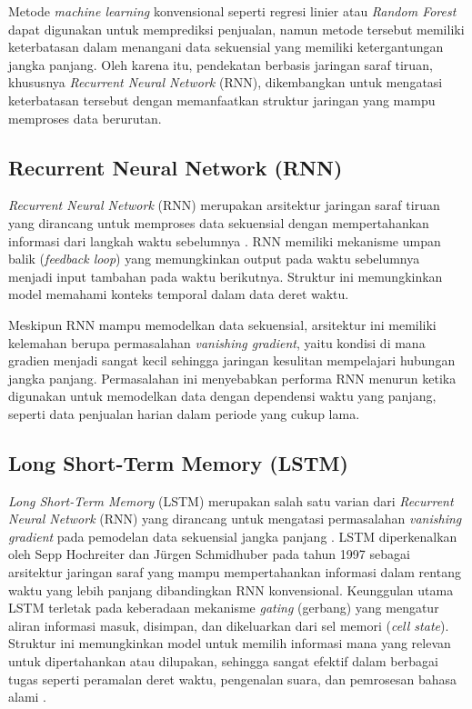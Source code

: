 Metode \textit{machine learning} konvensional seperti regresi linier atau \textit{Random Forest} dapat digunakan untuk memprediksi penjualan, namun metode tersebut memiliki keterbatasan dalam menangani data sekuensial yang memiliki ketergantungan jangka panjang. Oleh karena itu, pendekatan berbasis jaringan saraf tiruan, khususnya \textit{Recurrent Neural Network} (RNN), dikembangkan untuk mengatasi keterbatasan tersebut dengan memanfaatkan struktur jaringan yang mampu memproses data berurutan.

\subsection{Recurrent Neural Network (RNN)}
\textit{Recurrent Neural Network} (RNN) merupakan arsitektur jaringan saraf tiruan yang dirancang untuk memproses data sekuensial dengan mempertahankan informasi dari langkah waktu sebelumnya \cite{Goodfellow2016}. RNN memiliki mekanisme umpan balik (\textit{feedback loop}) yang memungkinkan output pada waktu sebelumnya menjadi input tambahan pada waktu berikutnya. Struktur ini memungkinkan model memahami konteks temporal dalam data deret waktu.

Meskipun RNN mampu memodelkan data sekuensial, arsitektur ini memiliki kelemahan berupa permasalahan \textit{vanishing gradient}, yaitu kondisi di mana gradien menjadi sangat kecil sehingga jaringan kesulitan mempelajari hubungan jangka panjang. Permasalahan ini menyebabkan performa RNN menurun ketika digunakan untuk memodelkan data dengan dependensi waktu yang panjang, seperti data penjualan harian dalam periode yang cukup lama.

\subsection{Long Short-Term Memory (LSTM)}
\textit{Long Short-Term Memory} (LSTM) merupakan salah satu varian dari \textit{Recurrent Neural Network} (RNN) yang dirancang untuk mengatasi permasalahan \textit{vanishing gradient} pada pemodelan data sekuensial jangka panjang \cite{Hochreiter1997}. LSTM diperkenalkan oleh Sepp Hochreiter dan Jürgen Schmidhuber pada tahun 1997 sebagai arsitektur jaringan saraf yang mampu mempertahankan informasi dalam rentang waktu yang lebih panjang dibandingkan RNN konvensional. Keunggulan utama LSTM terletak pada keberadaan mekanisme \textit{gating} (gerbang) yang mengatur aliran informasi masuk, disimpan, dan dikeluarkan dari sel memori (\textit{cell state}). Struktur ini memungkinkan model untuk memilih informasi mana yang relevan untuk dipertahankan atau dilupakan, sehingga sangat efektif dalam berbagai tugas seperti peramalan deret waktu, pengenalan suara, dan pemrosesan bahasa alami \cite{Goodfellow2016}.

